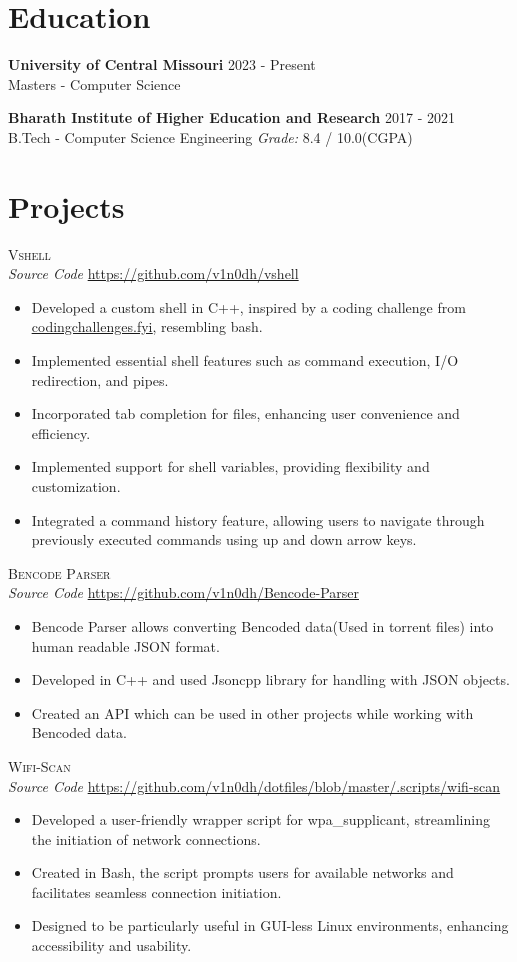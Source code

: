 \documentclass[10pt, letterpaper]{article}
\newcommand{\projsection}[2] {
	\raggedright{\large\scshape{#1}} \\
	{\small \textit{Source Code} \hspace{0.1em} \href{#2}{#2}}
}
\newcommand{\edusection}[4] {
	\textbf{#1}
	\hfill {#2} \\
	{#3}
	\hfill {#4}
}
\begin{document}
\section{Education}
\edusection
{University of Central Missouri}
{2023 {-} Present}
{Masters {-} Computer Science}
{}

\edusection
{Bharath Institute of Higher Education and Research}
{2017 {-} 2021}
{B.Tech {-} Computer Science Engineering}
{\textit{Grade:} 8.4 / 10.0(CGPA)}

\section{Projects}
\projsection
{Vshell}
{https://github.com/v1n0dh/vshell}
\begin{itemize}[leftmargin=6mm]
	\setlength\itemsep{0em}
	\item{Developed a custom shell in C++, inspired by a coding challenge from \href{https://codingchallenges.fyi/challenges/challenge-shell}{\underline {codingchallenges.fyi}}, resembling bash.}
	\item{Implemented essential shell features such as command execution, I/O redirection, and pipes.
}
	\item{Incorporated tab completion for files, enhancing user convenience and efficiency.}
	\item{Implemented support for shell variables, providing flexibility and customization.}
	\item{Integrated a command history feature, allowing users to navigate through previously executed commands using up and down arrow keys.}
\end{itemize}
\vspace*{-0.5em}

\projsection
{Bencode Parser}
{https://github.com/v1n0dh/Bencode-Parser}
\begin{itemize}[leftmargin=6mm]
	\setlength\itemsep{0em}
	\item{Bencode Parser allows converting Bencoded data(Used in torrent files) into human readable JSON format.}
	\item{Developed in C++ and used Jsoncpp library for handling with JSON objects.}
	\item{Created an API which can be used in other projects while working with Bencoded data.}
\end{itemize}
\vspace*{-0.5em}

\projsection
{Wifi-Scan}
{https://github.com/v1n0dh/dotfiles/blob/master/.scripts/wifi-scan}
\begin{itemize}[leftmargin=6mm]
	\setlength\itemsep{0em}
	\item{Developed a user-friendly wrapper script for wpa\_supplicant, streamlining the initiation of network connections.}
	\item{Created in Bash, the script prompts users for available networks and facilitates seamless connection initiation.}
	\item{Designed to be particularly useful in GUI-less Linux environments, enhancing accessibility and usability.}
\end{itemize}
\end{document}
